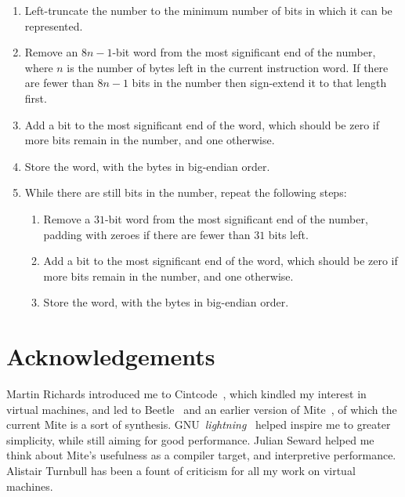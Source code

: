 \documentclass[english]{scrartcl}
\begin{document}
\begin{enumerate}
\item Left-truncate the number to the minimum number of bits in which it can
be represented.

\item Remove an $8n-1$-bit word from the most significant end of the number,
where $n$ is the number of bytes left in the current instruction word. If
there are fewer than $8n-1$ bits in the number then sign-extend it to that
length first.

\item Add a bit to the most significant end of the word, which should be
zero if more bits remain in the number, and one otherwise.

\item Store the word, with the bytes in big-endian order.

\item While there are still bits in the number, repeat the following steps:

\begin{enumerate}

\item Remove a $31$-bit word from the most significant end of the number,
padding with zeroes if there are fewer than $31$ bits left.

\item Add a bit to the most significant end of the word, which should be
zero if more bits remain in the number, and one otherwise.

\item Store the word, with the bytes in big-endian order.
\end{enumerate}

\end{enumerate}



\section{Acknowledgements}

Martin Richards introduced me to Cintcode~\cite{cintcode}, which kindled my
interest in virtual machines, and led to Beetle~\cite{beetledis} and an
earlier version of Mite~\cite{mite}, of which the current Mite is a sort of
synthesis. GNU~\emph{lightning}~\cite{lightning} helped inspire me to
greater simplicity, while still aiming for good performance. Julian Seward
helped me think about Mite's usefulness as a compiler target, and
interpretive performance. Alistair Turnbull has been a fount of criticism
for all my work on virtual machines.




\end{document}
